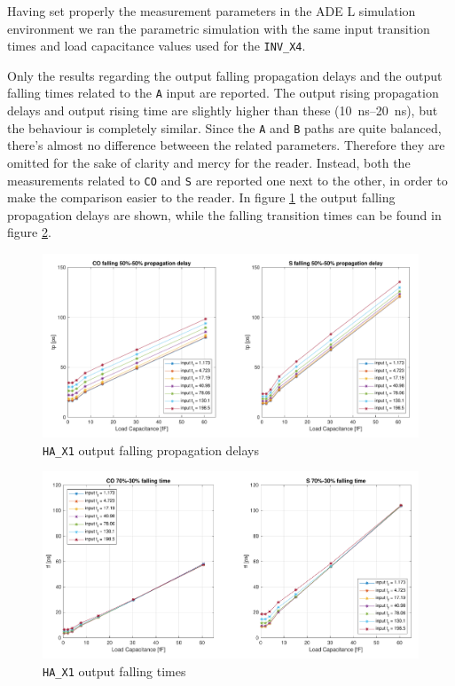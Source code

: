 \documentclass[a4paper]{article}
\newcommand{\inv}{\texttt{INV\_X4}\xspace}
\newcommand{\ha}{\texttt{HA\_X1}\xspace}
\begin{document}
Having set properly the measurement parameters in the ADE L simulation environment we ran the parametric simulation with the same input transition times and load capacitance values used for the \inv.

Only the results regarding the output falling propagation delays and the output falling times related to the \texttt{A} input are reported. The output rising propagation delays and output rising time are slightly higher than these (\SIrange{10}{20}{\nano\second}), but the behaviour is completely similar. Since the \texttt{A} and \texttt{B} paths are quite balanced, there's almost no difference betweeen the related parameters. Therefore they are omitted for the sake of clarity and mercy for the reader. Instead, both the measurements related to \texttt{CO} and \texttt{S} are reported one next to the other, in order to make the comparison easier to the reader. In figure \ref{fig:HA_tp_L} the output falling propagation delays are shown, while the falling transition times can be found in figure \ref{fig:HA_t_F}.

\begin{figure}[ht]
	\centering
	\includegraphics[width=\linewidth]{Images/HA/tp_L_crop.pdf}
	\caption{\ha output falling propagation delays}
	\label{fig:HA_tp_L}
\end{figure}

\begin{figure}[ht]
	\centering
	\includegraphics[width=\linewidth]{Images/HA/t_F_crop.pdf}
	\caption{\ha output falling times}
	\label{fig:HA_t_F}
\end{figure}
\end{document}
